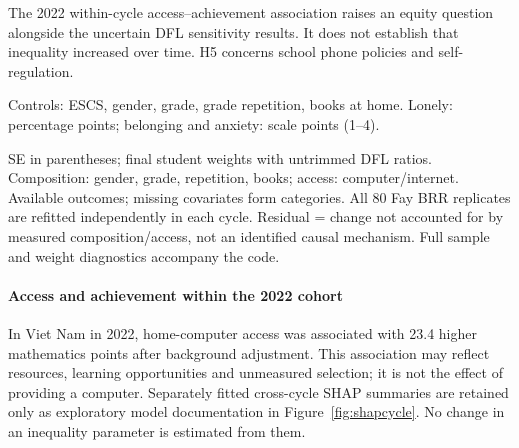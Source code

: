 \documentclass[preprint,12pt,authoryear,nonatbib]{elsarticle}
\begin{document}
The 2022 within-cycle access--achievement association raises an equity question alongside the uncertain DFL sensitivity results. It does not establish that inequality increased over time. H5 concerns school phone policies and self-regulation.

\begin{table}[H]\centering\scriptsize
\caption{Viet Nam: within-cycle associations of home digital access with well-being (SE in parentheses)}\label{tab:access}

\par\smallskip\raggedright\footnotesize Controls: ESCS, gender, grade, grade repetition, books at home. Lonely: percentage points; belonging and anxiety: scale points (1--4).
\end{table}

\begin{table}[H]\centering\footnotesize
\caption{Viet Nam: DiNardo--Fortin--Lemieux decomposition of the 2012--2022 change}\label{tab:dfl}

\par\smallskip\raggedright\footnotesize SE in parentheses; final student weights with untrimmed DFL ratios. Composition: gender, grade, repetition, books; access: computer/internet. Available outcomes; missing covariates form categories. All 80 Fay BRR replicates are refitted independently in each cycle. Residual = change not accounted for by measured composition/access, not an identified causal mechanism. Full sample and weight diagnostics accompany the code.
\end{table}

\paragraph{Access and achievement within the 2022 cohort} In Viet Nam in 2022, home-computer access was associated with 23.4 higher mathematics points after background adjustment. This association may reflect resources, learning opportunities and unmeasured selection; it is not the effect of providing a computer. Separately fitted cross-cycle SHAP summaries are retained only as exploratory model documentation in Figure~\ref{fig:shapcycle}. No change in an inequality parameter is estimated from them.
\end{document}
